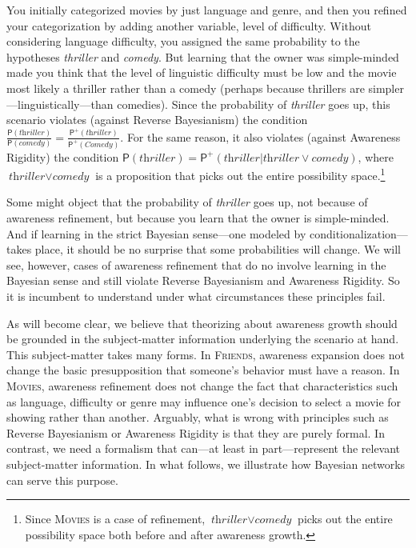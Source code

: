 \documentclass[
  11pt,
  dvipsnames,enabledeprecatedfontcommands]{scrartcl}
\newcommand{\pr}[1]{\ensuremath{\mathsf{P}(#1)}}
\newcommand{\ppr}[2]{\ensuremath{\mathsf{P}^{#1}(#2)}}
\begin{document}
\noindent You initially categorized movies by just language and genre,
and then you refined your categorization by adding another variable,
level of difficulty. Without considering language difficulty, you
assigned the same probability to the hypotheses \textit{thriller} and
\textit{comedy}. But learning that the owner was simple-minded made you
think that the level of linguistic difficulty must be low and the movie
most likely a thriller rather than a comedy (perhaps because thrillers
are simpler---linguistically---than comedies). Since the probability of
\textit{thriller} goes up, this scenario violates (against Reverse
Bayesianism) the condition
\(\frac{\pr{\textit{thriller}}}{\pr{\textit{comedy}}}=\frac{\ppr{+}{\textit{thriller}}}{\ppr{+}{\textit{Comedy}}}\).
For the same reason, it also violates (against Awareness Rigidity) the
condition
\(\pr{\textit{thriller}}=\ppr{+}{\textit{thriller} \vert \textit{thriller}\vee \textit{comedy}}\),
where \(\textit{thriller}\vee \textit{comedy}\) is a proposition that
picks out the entire possibility space.\footnote{Since \textsc{Movies}
  is a case of refinement, \(\textit{thriller}\vee \textit{comedy}\)
  picks out the entire possibility space both before and after awareness
  growth.}

Some might object that the probability of \textit{thriller} goes up, not
because of awareness refinement, but because you learn that the owner is
simple-minded. And if learning in the strict Bayesian sense---one
modeled by conditionalization---takes place, it should be no surprise
that some probabilities will change. We will see, however, cases of
awareness refinement that do no involve learning in the Bayesian sense
and still violate Reverse Bayesianism and Awareness Rigidity. So it is
incumbent to understand under what circumstances these principles fail.

As will become clear, we believe that theorizing about awareness growth
should be grounded in the subject-matter information underlying the
scenario at hand. This subject-matter takes many forms. In
\textsc{Friends}, awareness expansion does not change the basic
presupposition that someone's behavior must have a reason. In
\textsc{Movies}, awareness refinement does not change the fact that
characteristics such as language, difficulty or genre may influence
one's decision to select a movie for showing rather than another.
Arguably, what is wrong with principles such as Reverse Bayesianism or
Awareness Rigidity is that they are purely formal. In contrast, we need
a formalism that can---at least in part---represent the relevant
subject-matter information. In what follows, we illustrate how Bayesian
networks can serve this purpose.
\end{document}
